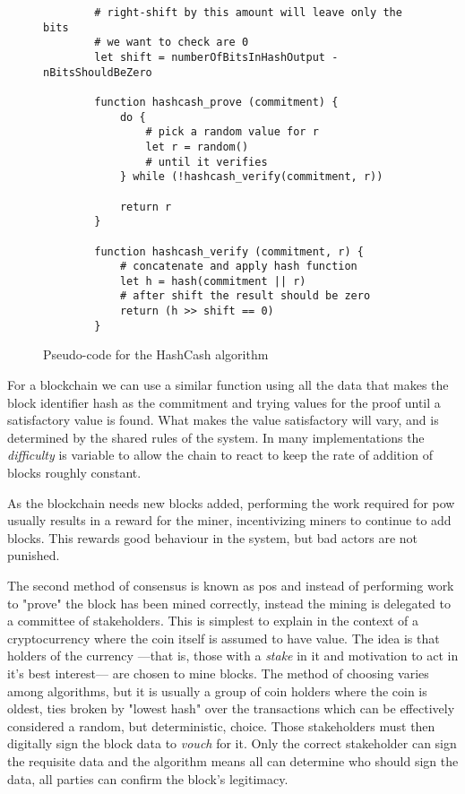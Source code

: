 \begin{figure}[h]
    \centering
    \begin{lstlisting}
        # right-shift by this amount will leave only the bits
        # we want to check are 0
        let shift = numberOfBitsInHashOutput - nBitsShouldBeZero

        function hashcash_prove (commitment) {
            do {
                # pick a random value for r
                let r = random()
                # until it verifies
            } while (!hashcash_verify(commitment, r))

            return r
        }

        function hashcash_verify (commitment, r) {
            # concatenate and apply hash function
            let h = hash(commitment || r)
            # after shift the result should be zero
            return (h >> shift == 0)
        }

        \end{lstlisting}
    \caption{Pseudo-code for the HashCash algorithm}
    \label{fig:hashcash}
\end{figure}

For a blockchain we can use a similar function using all the data that makes the block identifier hash as the commitment and trying values for the proof until a satisfactory value is found. What makes the value satisfactory will vary, and is determined by the shared rules of the system. In many implementations the \emph{difficulty} is variable to allow the chain to react to keep the rate of addition of blocks roughly constant.

As the blockchain needs new blocks added, performing the work required for \gls{pow} usually results in a reward for the miner, incentivizing miners to continue to add blocks. This rewards good behaviour in the system, but bad actors are not punished.

The second method of consensus is known as \gls{pos} and instead of performing work to "prove" the block has been mined correctly, instead the mining is delegated to a committee of stakeholders. This is simplest to explain in the context of a cryptocurrency where the coin itself is assumed to have value. The idea is that holders of the currency ---that is, those with a \emph{stake} in it and motivation to act in it's best interest--- are chosen to mine blocks. The method of choosing varies among algorithms, but it is usually a group of coin holders where the coin is oldest, ties broken by "lowest hash" over the transactions which can be effectively considered a random, but deterministic, choice. Those stakeholders must then digitally sign the block data to \emph{vouch} for it. Only the correct stakeholder can sign the requisite data and the algorithm means all can determine who should sign the data, all parties can confirm the block's legitimacy.

